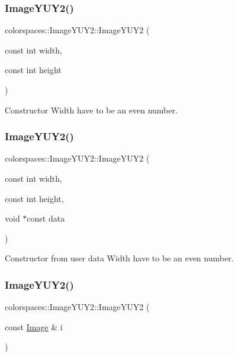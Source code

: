 \subsubsection{\texorpdfstring{Image\+Y\+U\+Y2()}{ImageYUY2()}\hspace{0.1cm}{\footnotesize\ttfamily [1/3]}}
{\footnotesize\ttfamily colorspaces\+::\+Image\+Y\+U\+Y2\+::\+Image\+Y\+U\+Y2 (\begin{DoxyParamCaption}\item[{const int}]{width,  }\item[{const int}]{height }\end{DoxyParamCaption})}

Constructor Width have to be an even number. \mbox{\label{classcolorspaces_1_1_image_y_u_y2_a918f2f42079ab1fb39011879cb8665cf}} 
\subsubsection{\texorpdfstring{Image\+Y\+U\+Y2()}{ImageYUY2()}\hspace{0.1cm}{\footnotesize\ttfamily [2/3]}}
{\footnotesize\ttfamily colorspaces\+::\+Image\+Y\+U\+Y2\+::\+Image\+Y\+U\+Y2 (\begin{DoxyParamCaption}\item[{const int}]{width,  }\item[{const int}]{height,  }\item[{void $\ast$const}]{data }\end{DoxyParamCaption})}

Constructor from user data Width have to be an even number. \mbox{\label{classcolorspaces_1_1_image_y_u_y2_aae420889824945d630e9fbaf77e869ad}} 
\subsubsection{\texorpdfstring{Image\+Y\+U\+Y2()}{ImageYUY2()}\hspace{0.1cm}{\footnotesize\ttfamily [3/3]}}
{\footnotesize\ttfamily colorspaces\+::\+Image\+Y\+U\+Y2\+::\+Image\+Y\+U\+Y2 (\begin{DoxyParamCaption}\item[{const \hyperlink{classcolorspaces_1_1_image}{Image} \&}]{i }\end{DoxyParamCaption})}

